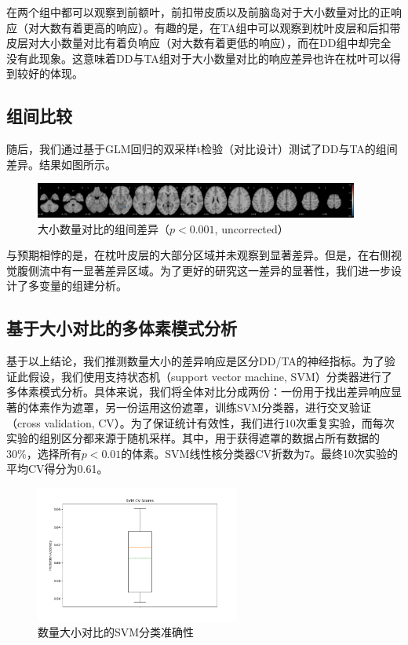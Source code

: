 \documentclass[bachelor, comfort]{shtthesis}
\begin{document}
在两个组中都可以观察到前额叶，前扣带皮质以及前脑岛对于大小数量对比的正响应（对大数有着更高的响应）。有趣的是，在TA组中可以观察到枕叶皮层和后扣带皮层对大小数量对比有着负响应（对大数有着更低的响应），而在DD组中却完全没有此现象。这意味着DD与TA组对于大小数量对比的响应差异也许在枕叶可以得到较好的体现。

\subsection{组间比较}
随后，我们通过基于GLM回归的双采样t检验（对比设计）测试了DD与TA的组间差异。结果如图所示。

\begin{figure}[h]
	\centering
	\includegraphics[width=0.95\textwidth]{figures/4_DD_TA_big_small.png}
	\caption{\label{fig:between_group_big_small} 大小数量对比的组间差异（$p<0.001$, uncorrected）}
\end{figure}

与预期相悖的是，在枕叶皮层的大部分区域并未观察到显著差异。但是，在右侧视觉腹侧流中有一显著差异区域。为了更好的研究这一差异的显著性，我们进一步设计了多变量的组建分析。

\subsection{基于大小对比的多体素模式分析}
基于以上结论，我们推测数量大小的差异响应是区分DD/TA的神经指标。为了验证此假设，我们使用支持状态机（support vector machine, SVM）分类器进行了多体素模式分析。具体来说，我们将全体对比分成两份：一份用于找出差异响应显著的体素作为遮罩，另一份运用这份遮罩，训练SVM分类器，进行交叉验证（cross validation, CV）。为了保证统计有效性，我们进行10次重复实验，而每次实验的组别区分都来源于随机采样。其中，用于获得遮罩的数据占所有数据的30\%，选择所有$p<0.01$的体素。SVM线性核分类器CV折数为7。最终10次实验的平均CV得分为0.61。

\begin{figure}[h]
	\centering
	\includegraphics[width=0.60\textwidth]{figures/5_svm_plot.png}
	\caption{\label{fig:svm_plot} 数量大小对比的SVM分类准确性 }
\end{figure}
\end{document}
